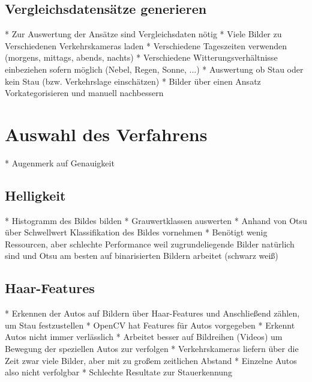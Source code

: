 \subsection{Vergleichsdatensätze generieren}
* Zur Auswertung der Ansätze sind Vergleichsdaten nötig\newline
* Viele Bilder zu Verschiedenen Verkehrskameras laden\newline
* Verschiedene Tageszeiten verwenden (morgens, mittags, abends, nachts)\newline
* Verschiedene Witterungsverhältnisse einbeziehen sofern möglich (Nebel, Regen, Sonne, ...)\newline
* Auswertung ob Stau oder kein Stau (bzw. Verkehrslage einschätzen)\newline
* Bilder über einen Ansatz Vorkategorisieren und manuell nachbessern\newline

\section{Auswahl des Verfahrens}
* Augenmerk auf Genauigkeit

\subsection{Helligkeit}
* Histogramm des Bildes bilden\newline
* Grauwertklassen auswerten\newline
* Anhand von Otsu über Schwellwert Klassifikation des Bildes vornehmen\newline
* Benötigt wenig Ressourcen, aber schlechte Performance weil zugrundeliegende Bilder \newline
	natürlich sind und Otsu am besten auf binarisierten Bildern arbeitet (schwarz weiß)
	
\subsection{Haar-Features}
* Erkennen der Autos auf Bildern über Haar-Features und Anschließend zählen, um Stau festzustellen\newline
* OpenCV hat Features für Autos vorgegeben\newline
* Erkennt Autos nicht immer verlässlich\newline
* Arbeitet besser auf Bildreihen (Videos) um Bewegung der speziellen Autos zur verfolgen\newline
* Verkehrskameras liefern über die Zeit zwar viele Bilder, aber mit zu großem zeitlichen Abstand\newline
* Einzelne Autos also nicht verfolgbar\newline
* Schlechte Resultate zur Stauerkennung\newline

